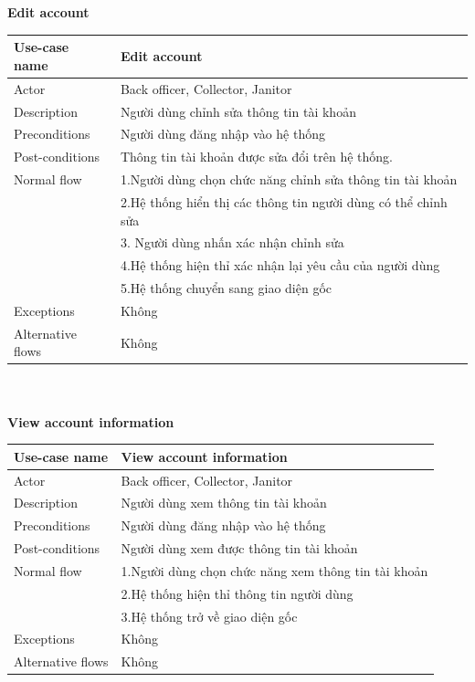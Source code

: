 \documentclass[a4paper]{article}
\begin{document}
\begin{enumerate}
\begin{tabular}{| p{3cm} | p{10cm} |}
\end{tabular}\\ 
\vspace{0.5cm} \\
\textbf{Edit account} \\
\begin{tabular}{| p{3cm} | p{10cm} |}
  \hline
     Use-case name & Edit account
     \\
     \hline
     Actor & Back officer, Collector, Janitor
     \\ \hline
     Description & Người dùng chỉnh sửa thông tin tài khoản
      \\
     \hline
     Preconditions & Người dùng đăng nhập vào hệ thống
     \\ \hline
           Post-conditions & Thông tin tài khoản được sửa đổi trên hệ thống.
     \\ \hline
      Normal flow & 1.Người dùng chọn chức năng chỉnh sửa thông tin tài khoản \\
      & 2.Hệ thống hiển thị các thông tin người dùng có thể chỉnh sửa \\
      & 3. Người dùng nhấn xác nhận chỉnh sửa\\
& 4.Hệ thống hiện thỉ xác nhận lại yêu cầu của người dùng \\
& 5.Hệ thống chuyển sang giao diện gốc\\
\hline
     Exceptions & Không
     \\ \hline
     Alternative flows & Không
     \\ \hline
     
\end{tabular}\\
\vspace{0.5cm}\\
\textbf{View account information} \\
\begin{tabular}{| p{3cm} | p{10cm} |}
  \hline
     Use-case name & View account information
     \\
     \hline
     Actor & Back officer, Collector, Janitor
     \\ \hline
     Description & Người dùng xem thông tin tài khoản
      \\
     \hline
     Preconditions & Người dùng đăng nhập vào hệ thống
     \\ \hline
           Post-conditions & Người dùng xem được thông tin tài khoản
     \\ \hline
      Normal flow & 1.Người dùng chọn chức năng xem thông tin tài khoản \\
& 2.Hệ thống hiện thỉ thông tin người dùng \\
& 3.Hệ thống trở về giao diện gốc\\
\hline
     Exceptions & Không
     \\ \hline
     Alternative flows & Không
     \\ \hline
     

\end{tabular}
\end{enumerate}
\end{document}
